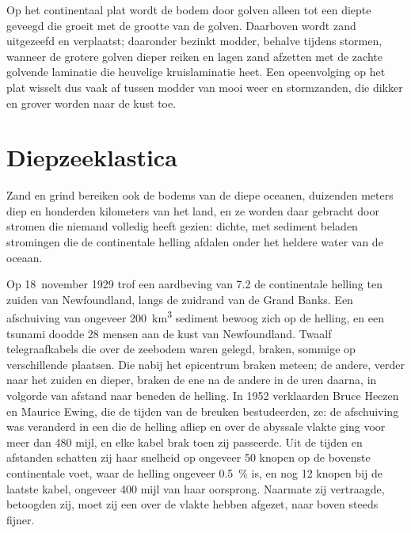 Op het continentaal plat wordt de bodem door golven alleen tot een diepte geveegd die groeit met de grootte van de golven. Daarboven wordt zand uitgezeefd en verplaatst; daaronder bezinkt modder, behalve tijdens stormen, wanneer de grotere golven dieper reiken en lagen zand afzetten met de zachte golvende laminatie die heuvelige kruislaminatie heet. Een opeenvolging op het plat wisselt dus vaak af tussen modder van mooi weer en stormzanden, die dikker en grover worden naar de kust toe.

\section{Diepzeeklastica}\label{sec:b1:clastic-sediments:deep-sea}

Zand en grind bereiken ook de bodems van de diepe oceanen, duizenden meters diep en honderden kilometers van het land, en ze worden daar gebracht door stromen die niemand volledig heeft gezien: dichte, met sediment beladen stromingen die de continentale helling afdalen onder het heldere water van de oceaan.

\begin{history}
Op 18~november 1929 trof een aardbeving van  7.2 de continentale helling ten zuiden van Newfoundland, langs de zuidrand van de Grand Banks. Een afschuiving van ongeveer \qty{200}{km^3} sediment bewoog zich op de helling, en een tsunami doodde 28 mensen aan de kust van Newfoundland. Twaalf telegraafkabels die over de zeebodem waren gelegd, braken, sommige op verschillende plaatsen. Die nabij het epicentrum braken meteen; de andere, verder naar het zuiden en dieper, braken de ene na de andere in de uren daarna, in volgorde van afstand naar beneden de helling. In 1952 verklaarden Bruce Heezen en Maurice Ewing, die de tijden van de breuken bestudeerden, ze: de afschuiving was veranderd in een  die de helling afliep en over de abyssale vlakte ging voor meer dan 480 mijl, en elke kabel brak toen zij passeerde. Uit de tijden en afstanden schatten zij haar snelheid op ongeveer 50 knopen op de bovenste continentale voet, waar de helling ongeveer \qty{0.5}{\percent} is, en nog 12 knopen bij de laatste kabel, ongeveer 400 mijl van haar oorsprong. Naarmate zij vertraagde, betoogden zij, moet zij een  over de vlakte hebben afgezet, naar boven steeds fijner.
\end{history}

